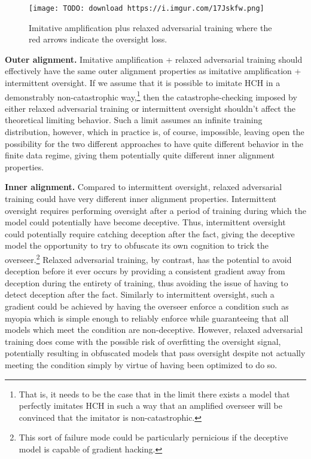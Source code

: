 \documentclass[
  onecolumn,
  natbib,
]{miri-tech-article}
\begin{document}
\begin{figure}[h!]
  \centering
  \texttt{[image: TODO: download https://i.imgur.com/17Jskfw.png]}
  \caption{Imitative amplification plus relaxed adversarial training where the red arrows indicate the oversight loss.}
\end{figure}

\textbf{Outer alignment.} Imitative amplification + relaxed adversarial training should effectively have the same outer alignment properties as imitative amplification + intermittent oversight. If we assume that it is possible to imitate HCH in a demonstrably non-catastrophic way,\footnote{That is, it needs to be the case that in the limit there exists a model that perfectly imitates HCH in such a way that an amplified overseer will be convinced that the imitator is non-catastrophic.} then the catastrophe-checking imposed by either relaxed adversarial training or intermittent oversight shouldn't affect the theoretical limiting behavior. Such a limit assumes an infinite training distribution, however, which in practice is, of course, impossible, leaving open the possibility for the two different approaches to have quite different behavior in the finite data regime, giving them potentially quite different inner alignment properties.

\textbf{Inner alignment.} Compared to intermittent oversight, relaxed adversarial training could have very different inner alignment properties. Intermittent oversight requires performing oversight after a period of training during which the model could potentially have become deceptive. Thus, intermittent oversight could potentially require catching deception after the fact, giving the deceptive model the opportunity to try to obfuscate its own cognition to trick the overseer.\footnote{This sort of failure mode could be particularly pernicious if the deceptive model is capable of gradient hacking\cite{TODO: cite https://www.alignmentforum.org/posts/uXH4r6MmKPedk8rMA/gradient-hacking}.} Relaxed adversarial training, by contrast, has the potential to avoid deception before it ever occurs by providing a consistent gradient away from deception during the entirety of training, thus avoiding the issue of having to detect deception after the fact. Similarly to intermittent oversight, such a gradient could be achieved by having the overseer enforce a condition such as myopia\cite{TODO: cite https://www.alignmentforum.org/posts/BKM8uQS6QdJPZLqCr/towards-a-mechanistic-understanding-of-corrigibility} which is simple enough to reliably enforce while guaranteeing that all models which meet the condition are non-deceptive. However, relaxed adversarial training does come with the possible risk of overfitting the oversight signal, potentially resulting in obfuscated models that pass oversight despite not actually meeting the condition simply by virtue of having been optimized to do so.
\end{document}
